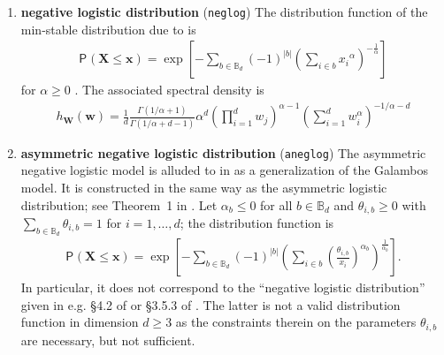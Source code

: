 \documentclass{article}\usepackage[]{graphicx}\usepackage[]{xcolor}
\newcommand{\bs}[1]{\boldsymbol {#1}}
\renewcommand{\P}[2][]{{\mathsf P}_{#1}\left(#2\right)}
\newcommand{\code}[1]{\texttt{#1}}
\newcommand{\pfrac}[2]{\left(\frac{#1}{#2}\right)}
\begin{document}
\begin{enumerate}
\item \textbf{negative logistic distribution} (\code{neglog})
The distribution function of the min-stable distribution due to \cite{Galambos:1975}  is
\begin{align*}
   \P{\bs{X} \leq \bs{x}} = \exp \left[ -\sum_{b \in \mathbb{B}_d} (-1)^{|b|}\left(\sum_{i \in b}
{x_i}^{\alpha}\right)^{-\frac{1}{\alpha}}\right]
\end{align*}
for $\alpha \geq 0$ \citep{Dombry:2016}. The associated spectral density is
\begin{align*}
   h_{\bs{W}}(\bs{w}) = \frac{1}{d}
\frac{\Gamma(1/\alpha+1)}{\Gamma(1/\alpha + d-1)} \alpha^d\left(\prod_{i=1}^d w_j\right)^{\alpha-1}\left(\sum_{i=1}^d
w_i^{\alpha}\right)^{-1/\alpha-d}
\end{align*}

\item \textbf{asymmetric negative logistic distribution} (\code{aneglog})
The asymmetric negative logistic model is alluded to in \cite{Joe:1990} as a generalization of the Galambos model. It is constructed in the same way as the asymmetric logistic distribution; see Theorem~1 in \cite{Stephenson:2003}. Let $\alpha_b \leq 0$ for all $b \in \mathbb{B}_d$ and $\theta_{i, b} \geq 0$ with $\sum_{b \in \mathbb{B}_d} \theta_{i, b} =1$ for $i=1, \ldots, d$; the distribution function is
\begin{align*}
      \P{\bs{X} \leq \bs{x}} = \exp \left[ -\sum_{b \in \mathbb{B}_d}(-1)^{|b|}
\left(\sum_{i \in b}
\pfrac{\theta_{i, b}}{x_i}^{\alpha_b}\right)^{\frac{1}{\alpha_b}}\right].
\end{align*}
In particular, it does not correspond to the ``negative logistic distribution'' given in e.g. \S 4.2 of \cite{Coles:1991}  or \S 3.5.3 of \cite{Kotz:2000}. The latter is not a valid
distribution function in dimension $d \geq 3$ as the constraints therein on the parameters $\theta_{i, b}$ are necessary, but not sufficient.


\end{enumerate}
\end{document}
